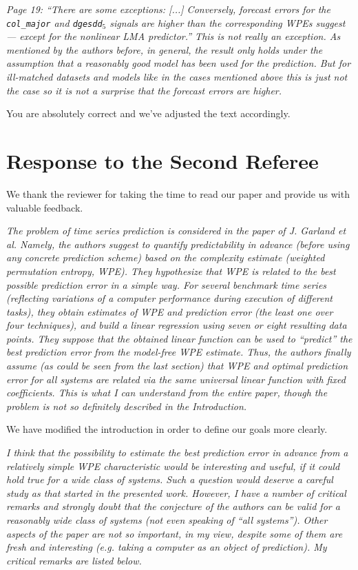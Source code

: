 \documentclass[12pt]{article}
\begin{document}
\emph{Page 19: ``There are some exceptions: [...] Conversely, forecast errors
for the \texttt{col\_major} and \texttt{dgesdd$_5$} signals are higher than the
corresponding WPEs suggest --- except for the nonlinear LMA predictor.'' This is
not really an exception. As mentioned by the authors before, in general, the
result only holds under the assumption that a reasonably good model has been
used for the prediction. But for ill-matched datasets and models like in the
cases mentioned above this is just not the case so it is not a surprise that the
forecast errors are higher.}

You are absolutely correct and we've adjusted the text accordingly.

\section*{Response to the Second Referee}

We thank the reviewer for taking the time to read our paper and
provide us with valuable feedback.

\emph{The problem of time series prediction is considered in the paper
  of J.  Garland et al. Namely, the authors suggest to quantify
  predictability in advance (before using any concrete prediction
  scheme) based on the complexity estimate (weighted permutation
  entropy, WPE). They hypothesize that WPE is related to the best
  possible prediction error in a simple way. For several benchmark
  time series (reflecting variations of a computer performance during
  execution of different tasks), they obtain estimates of WPE and
  prediction error (the least one over four techniques), and build a
  linear regression using seven or eight resulting data points. They
  suppose that the obtained linear function can be used to ``predict''
  the best prediction error from the model-free WPE estimate.  Thus,
  the authors finally assume (as could be seen from the last section)
  that WPE and optimal prediction error for all systems are related
  via the same universal linear function with fixed coefficients. This
  is what I can understand from the entire paper, though the problem
  is not so definitely described in the Introduction.}

We have modified the introduction in order to define our goals more
clearly.

\emph{I think that the possibility to estimate the best prediction
  error in advance from a relatively simple WPE characteristic would
  be interesting and useful, if it could hold true for a wide class of
  systems. Such a question would deserve a careful study as that
  started in the presented work. However, I have a number of critical
  remarks and strongly doubt that the conjecture of the authors can be
  valid for a reasonably wide class of systems (not even speaking of
  ``all systems''). Other aspects of the paper are not so important,
  in my view, despite some of them are fresh and interesting
  (e.g. taking a computer as an object of prediction). My critical
  remarks are listed below.}
\end{document}
